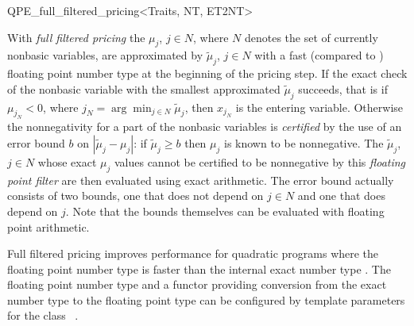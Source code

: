 
\begin{ccRefClass}{QPE_full_filtered_pricing<Traits, NT, ET2NT>}

\ccDefinition

With \emph{full filtered pricing} the $\mu_{j}$, $j \in N$, where $N$ denotes
the set of currently nonbasic variables, are approximated by
$\tilde{\mu}_{j}$, $j \in N$ with a fast (compared to )
floating point number type  at the beginning of the pricing step.
If the exact check of the nonbasic variable with the smallest
approximated $\tilde{\mu}_{j}$ succeeds, that is if $\mu_{j_{N}} < 0$, where 
$j_{N} =\arg\min_{j \in N}\tilde{\mu}_{j}$, then $x_{j_{N}}$ is the
entering variable. Otherwise the nonnegativity for a part of the
nonbasic variables is \emph{certified} by the use of an error bound $b$ on
$\left|\tilde{\mu}_{j} - \mu_{j}\right|$:
if $\tilde{\mu}_{j} \geq b$ then $\mu_{j}$ is known to
be nonnegative. The $\tilde{\mu}_{j}$, $j \in N$ whose exact $\mu_{j}$ values  
cannot be certified to be nonnegative by this \emph{floating point filter}
are then evaluated
using exact arithmetic. The error bound actually consists of two bounds, one
that does not depend on $j \in N$ and one that does depend on $j$. Note that
the bounds themselves can be evaluated with floating point arithmetic. 

Full filtered pricing improves performance for quadratic programs
where the floating point
number type  is faster than the internal exact number type .
The floating point number type  and a functor providing conversion from
the exact number type  to the floating point type  can be
configured by template parameters for the class \ccRefName\ .


\end{ccRefClass}
